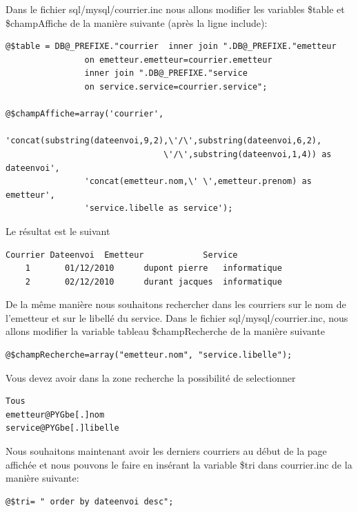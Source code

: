 \documentclass[letterpaper,10pt,french]{manual}
\begin{document}
Dans le fichier sql/mysql/courrier.inc nous allons modifier les variables  \$table
et  \$champAffiche de la manière suivante (après la ligne include):

\begin{Verbatim}[commandchars=@\[\]]
@$table = DB@_PREFIXE."courrier  inner join ".DB@_PREFIXE."emetteur
                on emetteur.emetteur=courrier.emetteur
                inner join ".DB@_PREFIXE."service
                on service.service=courrier.service";

@$champAffiche=array('courrier',
                'concat(substring(dateenvoi,9,2),\'/\',substring(dateenvoi,6,2),
                                \'/\',substring(dateenvoi,1,4)) as dateenvoi',
                'concat(emetteur.nom,\' \',emetteur.prenom) as emetteur',
                'service.libelle as service');
\end{Verbatim}

Le résultat est le suivant

\begin{Verbatim}[commandchars=@\[\]]
Courrier Dateenvoi  Emetteur            Service
    1       01/12/2010      dupont pierre   informatique
    2       02/12/2010      durant jacques  informatique
\end{Verbatim}

De la même manière nous souhaitons rechercher dans les courriers sur le
nom de l'emetteur et sur le libellé du service. Dans le fichier sql/mysql/courrier.inc,
nous allons modifier la variable tableau \$champRecherche de la manière suivante

\begin{Verbatim}[commandchars=@\[\]]
@$champRecherche=array("emetteur.nom", "service.libelle");
\end{Verbatim}

Vous devez avoir dans la zone recherche la possibilité de selectionner

\begin{Verbatim}[commandchars=@\[\]]
Tous
emetteur@PYGbe[.]nom
service@PYGbe[.]libelle
\end{Verbatim}

Nous souhaitons maintenant avoir les derniers courriers au début de la page affichée et nous
pouvons le faire en insérant la variable \$tri dans courrier.inc de la manière suivante:

\begin{Verbatim}[commandchars=@\[\]]
@$tri= " order by dateenvoi desc";
\end{Verbatim}
\end{document}
